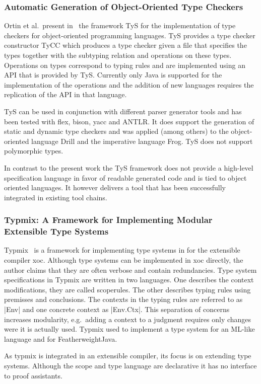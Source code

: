 \subsubsection{Automatic Generation of Object-Oriented Type Checkers}
Ortin et al.\ present in~\cite{ortin2014automatic} the framework TyS
for the implementation of type checkers for object-oriented
programming languages. TyS provides a type checker constructor TyCC
which produces a type checker given a file that specifies the types
together with the subtyping relation and operations on these
types. Operations on types correspond to typing rules and are
implemented using an API that is provided by TyS. Currently only Java
is supported for the implementation of the operations and the addition
of new languages requires the replication of the API in that
language.

TyS can be used in conjunction with different parser generator tools
and has been tested with flex, bison, yacc and ANTLR. It does support
the generation of static and dynamic type checkers and was applied
(among others) to the object-oriented language Drill and the
imperative language Frog. TyS does not support polymorphic types.

In contrast to the present work the TyS framework does not provide a
high-level specification language in favor of readable generated code
and is tied to object oriented languages. It however delivers a tool
that has been successfully integrated in existing tool chains.
\subsubsection{Typmix: A Framework for Implementing Modular Extensible Type
  Systems}
Typmix~\cite{bergan2007typmix} is a framework for implementing type
systems in for the extensible compiler xoc. Although type systems can
be implemented in xoc directly, the author claims that they are often
verbose and contain redundancies. Type system specifications in Typmix
are written in two languages. One describes the context modifications,
they are called scoperules. The other describes typing rules using
premisses and conclusions. The contexts in the typing rules are
referred to as \code|Env| and one concrete context as
\code|Env.Ctx|. This separation of concerns increases modularity,
e.g.\ adding a context to a judgment requires only changes were it is
actually used. Typmix used to implement a type system for an ML-like
language and for FeatherweightJava.

As typmix is integrated in an extensible compiler, its focus is on
extending type systems. Although the scope and type language are
declarative it has no interface to proof assistants.

